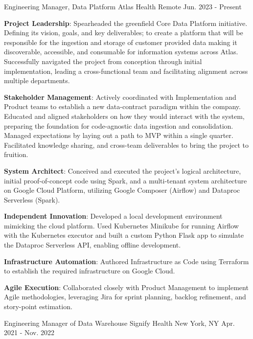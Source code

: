 \begin{cventries}
  \cventry
  {Engineering Manager, Data Platform}
  {Atlas Health}
  {Remote}
  {Jun. 2023 - Present}
  {
    \begin{cvitems}
        \item {\textbf{Project Leadership}: Spearheaded the greenfield Core Data Platform initiative. Defining its vision, goals, and key deliverables; to create a platform that will be responsible for the ingestion and storage of customer provided data making it discoverable, accessible, and consumable for information systems across Atlas. Successfully navigated the project from conception through initial implementation, leading a cross-functional team and facilitating alignment across multiple departments.}
        \item {\textbf{Stakeholder Management}: Actively coordinated with Implementation and Product teams to establish a new data-contract paradigm within the company. Educated and aligned stakeholders on how they would interact with the system, preparing the foundation for code-agnostic data ingestion and consolidation. Managed expectations by laying out a path to MVP within a single quarter. Facilitated knowledge sharing, and cross-team deliverables to bring the project to fruition.}
        \item {\textbf{System Architect}: Conceived and executed the project's logical architecture, initial proof-of-concept code using Spark, and a multi-tenant system architecture on Google Cloud Platform, utilizing Google Composer (Airflow) and Dataproc Serverless (Spark).}
        \item {\textbf{Independent Innovation}: Developed a local development environment mimicking the cloud platform. Used Kubernetes Minikube for running Airflow with the Kubernetes executor and built a custom Python Flask app to simulate the Dataproc Serverless API, enabling offline development.}
        \item {\textbf{Infrastructure Automation}: Authored Infrastructure as Code using Terraform to establish the required infrastructure on Google Cloud.}
        \item {\textbf{Agile Execution}: Collaborated closely with Product Management to implement Agile methodologies, leveraging Jira for sprint planning, backlog refinement, and story-point estimation.}
    \end{cvitems}
  }
  \cventry
    {Engineering Manager of Data Warehouse}
    {Signify Health}
    {New York, NY}
    {Apr. 2021 - Nov. 2022}

\end{cventries}
